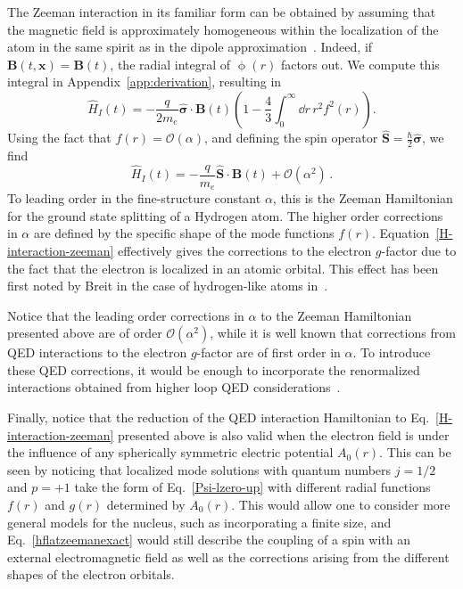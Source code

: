 \documentclass[letterpaper,12pt,titlepage,oneside,final]{book}
\begin{document}
The Zeeman interaction in its familiar form can be obtained by assuming that the magnetic field is approximately homogeneous within the localization of the atom in the same spirit as in the dipole approximation~\cite{ScullyBook}. Indeed, if $\bm B(t,\bm x) = \bm B(t)$, the radial integral of $\upphi(r)$ factors out. We compute this integral in Appendix~\ref{app:derivation}, resulting in
\begin{equation}\label{hflatzeemanexact}
\hat{H}_I(t) =  -\frac{q}{2m_e}\hat{\bm{\sigma}}\cdot \bm{B}(t)\left(1 -\frac{4}{3}\int_0^\infty \!\dd r \, r^2 f^2(r)\right).
\end{equation}
Using the fact that $f(r) = \mathcal{O}(\alpha)$, and defining the spin operator $\hat{\bm S} = \frac{\hbar}{2} \hat{\bm \sigma}$, we find
\begin{equation}\label{eq:HintB}
    \hat{H}_I(t) = - \frac{q}{m_e} \hat{\bm{S}}\cdot \bm{B}(t) + \mathcal{O}(\alpha^2) \, .
\end{equation}
To leading order in the fine-structure constant $\alpha$, this is the Zeeman Hamiltonian for the ground state splitting of a Hydrogen atom. The higher order corrections in $\alpha$ are defined by the specific shape of the mode functions $f(r)$. Equation~\eqref{H-interaction-zeeman} effectively gives the corrections to the electron $g$-factor due to the fact that the electron is localized in an atomic orbital. This effect has been first noted by Breit in the case of hydrogen-like atoms in~\cite{Breit1928}.

Notice that the leading order corrections in $\alpha$ to the Zeeman Hamiltonian presented above are of order $\mathcal{O}(\alpha^2)$, while it is well known that corrections from QED interactions to the electron $g$-factor are of first order in $\alpha$. To introduce these QED corrections, it would be enough to incorporate the renormalized interactions obtained from higher loop QED considerations~\cite{gfactorBeier2000,gfactorIndelicato2004,gfactorTwoLoop2013,gfactor2020,gfactorExp2023}.

Finally, notice that the reduction of the QED interaction Hamiltonian to Eq.~\eqref{H-interaction-zeeman} presented above is also valid when the electron field is under the influence of any spherically symmetric electric potential $A_0(r)$. This can be seen by noticing that localized mode solutions with quantum numbers $j=1/2$ and $p=+1$ take the form of Eq.~\eqref{Psi-lzero-up} with different radial functions $f(r)$ and $g(r)$ determined by $A_0(r)$. This would allow one to consider more general models for the nucleus, such as incorporating a finite size, and Eq.~\eqref{hflatzeemanexact} would still describe the coupling of a spin with an external electromagnetic field as well as the corrections arising from the different shapes of the electron orbitals.
\end{document}

